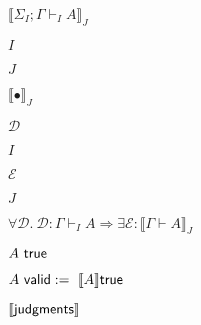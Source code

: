 \documentclass[10pt]{book}
\begin{document}
\begin{mdSnippets}
\begin{mdInlineSnippet}%
$ \llbracket \Sigma_I;\Gamma\vdash_I A\rrbracket_J$\end{mdInlineSnippet}%
\begin{mdInlineSnippet}[dd7536794b63bf90eccfd37f9b147d7f]%
$I$\end{mdInlineSnippet}%
\begin{mdInlineSnippet}%
$J$\end{mdInlineSnippet}%
\begin{mdInlineSnippet}%
$\llbracket\bullet \rrbracket_J$\end{mdInlineSnippet}%
\begin{mdInlineSnippet}%
$\mathcal{D}$\end{mdInlineSnippet}%
\begin{mdInlineSnippet}[dd7536794b63bf90eccfd37f9b147d7f]%
$I$\end{mdInlineSnippet}%
\begin{mdInlineSnippet}%
$\mathcal{E}$\end{mdInlineSnippet}%
\begin{mdInlineSnippet}%
$J$\end{mdInlineSnippet}%
\begin{mdInlineSnippet}[8ee221b554f334322dd70423103cfd8b]%
$\forall \mathcal{D}. \ \mathcal{D}:\Gamma\vdash_I A \Longrightarrow \exists\mathcal{E}: \llbracket \Gamma\vdash A\rrbracket_J$\end{mdInlineSnippet}%
\begin{mdInlineSnippet}%
$A \ {\sf true}$\end{mdInlineSnippet}%
\begin{mdInlineSnippet}[9f791c2d98cbbb2d22338197dd5d3ca4]%
$A\  {\sf valid}:=\  \llbracket A \rrbracket {\sf true}$\end{mdInlineSnippet}%
\begin{mdInlineSnippet}%
$\llbracket \sf {judgments}\rrbracket$\end{mdInlineSnippet}%

\end{mdSnippets}
\end{document}
